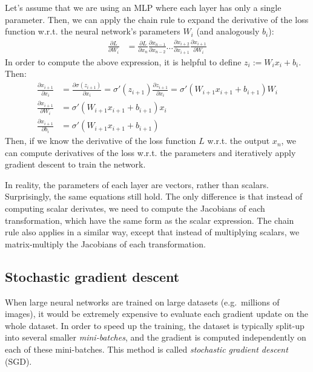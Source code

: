 \documentclass[12pt]{article}
\begin{document}
Let's assume that we are using an MLP where each layer has only a single parameter. Then, we can apply the chain rule to expand the derivative of the loss function w.r.t. the neural network's parameters $W_i$ (and analogously $b_i$):
\begin{align}
\frac{\partial L}{\partial W_i} &= \frac{\partial L}{\partial x_n} \frac{\partial x_{n-1}}{\partial x_{n-2}} \ldots \frac{\partial x_{i+2}}{\partial x_{i+1}} \frac{\partial x_{i+1}}{\partial W_i}
\end{align}
In order to compute the above expression, it is helpful to define $z_i := W_i x_i + b_i$. Then:
\begin{align}
\frac{\partial x_{i+1}}{\partial x_i} &= \frac{\partial \sigma(z_{i+1})}{\partial x_i} = \sigma'(z_{i+1}) \frac{\partial z_{i+1}}{\partial x_i} = \sigma'(W_{i+1} x_{i+1} + b_{i+1}) W_i \\
\frac{\partial x_{i+1}}{\partial W_i} &= \sigma'(W_{i+1} x_{i+1} + b_{i+1}) x_i \\
\frac{\partial x_{i+1}}{\partial b_i} &= \sigma'(W_{i+1} x_{i+1} + b_{i+1})
\end{align}
Then, if we know the derivative of the loss function $L$ w.r.t. the output $x_n$, we can compute derivatives of the loss w.r.t. the parameters and iteratively apply gradient descent to train the network.

In reality, the parameters of each layer are vectors, rather than scalars. Surprisingly, the same equations still hold. The only difference is that instead of computing scalar derivates, we need to compute the Jacobians of each transformation, which have the same form as the scalar expression. The chain rule also applies in a similar way, except that instead of multiplying scalars, we matrix-multiply the Jacobians of each transformation.

\subsection{Stochastic gradient descent}

When large neural networks are trained on large datasets (e.g.\ millions of images), it would be extremely expensive to evaluate each gradient update on the whole dataset. In order to speed up the training, the dataset is typically split-up into several smaller \textit{mini-batches}, and the gradient is computed independently on each of these mini-batches. This method is called \textit{stochastic gradient descent} (SGD).
\end{document}
